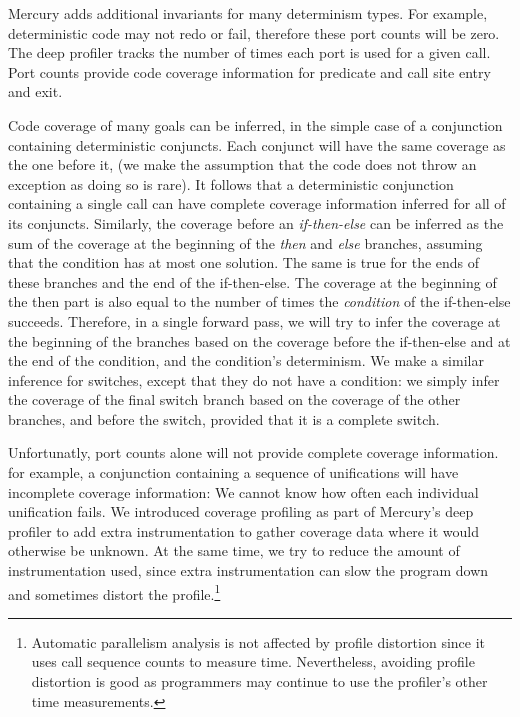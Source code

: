 \noindent
Mercury adds additional invariants for many determinism types.
For example, deterministic code may not redo or fail,
therefore these port counts will be zero.
The deep profiler tracks the number of times each port is used for a given
call.
Port counts provide code coverage information for predicate and call site
entry and exit.

Code coverage of many goals can be inferred,
in the simple case of a conjunction containing deterministic conjuncts.
Each conjunct will have the same coverage as the one before it,
(we make the assumption that the code does not throw an exception
as doing so is rare).
It follows that a deterministic conjunction containing a single call
can have complete coverage information inferred for all of its conjuncts.
Similarly,
the coverage before an \emph{if-then-else} can be inferred as the sum
of the coverage at the beginning of the \emph{then} and \emph{else}
branches,
assuming that the condition has at most one solution.
The same is true for the ends of these branches and the end of the
if-then-else.
The coverage at the beginning of the then part is also equal to the
number of times the \emph{condition} of the if-then-else succeeds.
Therefore,
in a single forward pass,
we will try to infer the coverage at the beginning of the branches
based on the coverage before the if-then-else and at the end of the
condition,
and the condition's determinism.
We make a similar inference for switches,
except that they do not have a condition:
we simply infer the
coverage of the final switch branch based on the coverage of the other
branches,
and before the switch,
provided that it is a complete switch.

Unfortunatly, port counts alone will not provide complete coverage
information.
for example, a conjunction containing a sequence of \dsemidet
unifications will have incomplete coverage information:
We cannot know how often each individual unification fails.
We introduced coverage profiling as part of Mercury's deep profiler to
add extra instrumentation to gather coverage data where it would
otherwise be unknown.
At the same time, we try to reduce the amount of instrumentation used,
since extra instrumentation can slow the program down and sometimes distort
the profile.\footnote{
    Automatic parallelism analysis is not affected by profile distortion
    since it uses call sequence counts to measure time.
    Nevertheless,
    avoiding profile distortion is good as
    programmers may continue to use the profiler's other
    time measurements.}

